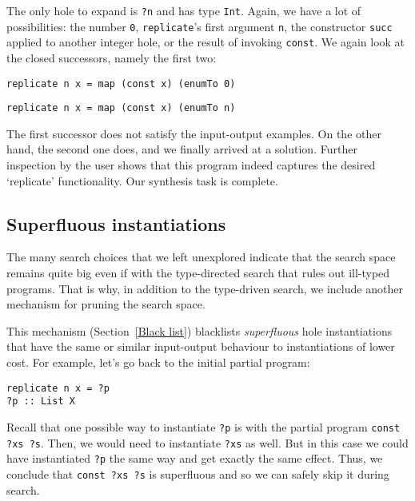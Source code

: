 The only hole to expand is \lstinline|?n| and has type \lstinline|Int|.  Again, we have a lot of possibilities: the number \lstinline|0|, \lstinline|replicate|'s first argument \lstinline|n|, the constructor \lstinline|succ| applied to another integer hole, or the result of invoking \lstinline|const|.  We again look at the closed successors, namely the first two:
\begin{lstlisting}
replicate n x = map (const x) (enumTo 0)
\end{lstlisting}
\begin{lstlisting}
replicate n x = map (const x) (enumTo n)
\end{lstlisting}
The first successor does not satisfy the input-output examples.  On the other hand, the second one does, and we finally arrived at a solution.  Further inspection by the user shows that this program indeed captures the desired `replicate' functionality.  Our synthesis task is complete.

\subsection{Superfluous instantiations}
The many search choices that we left unexplored indicate that the search space remains quite big even if with the type-directed search that rules out ill-typed programs.  That is why, in addition to the type-driven search, we include another mechanism for pruning the search space.

This mechanism (Section~\ref{Black list}) blacklists \emph{superfluous} hole instantiations that have the same or similar input-output behaviour to instantiations of lower cost.  For example, let's go back to the initial partial program:
\begin{lstlisting}[style=plain]
replicate n x = ?p
?p :: List X
\end{lstlisting}
Recall that one possible way to instantiate \lstinline|?p| is with the partial program \lstinline|const ?xs ?s|.  Then, we would need to instantiate \lstinline|?xs| as well.  But in this case we could have instantiated \lstinline|?p| the same way and get exactly the same effect.  Thus, we conclude that \lstinline|const ?xs ?s| is superfluous and so we can safely skip it during search.

